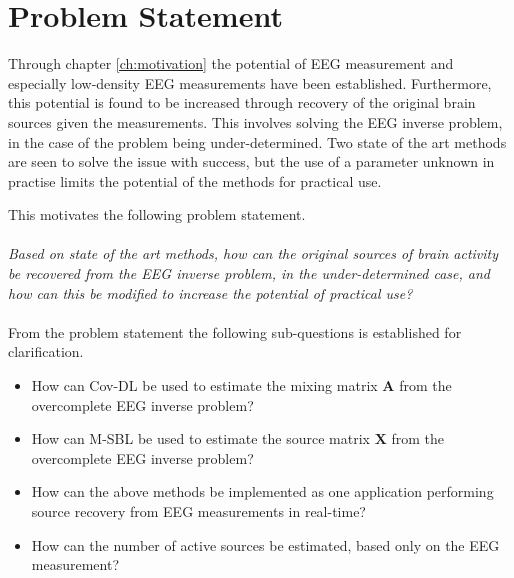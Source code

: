 \chapter{Problem Statement}\label{ch:problemstatement}
Through chapter \ref{ch:motivation} the potential of EEG measurement and especially low-density EEG measurements have been established. Furthermore, this potential is found to be increased through recovery of the original brain sources given the measurements. This involves solving the EEG inverse problem, in the case of the problem being under-determined.
Two state of the art methods are seen to solve the issue with success, but the use of a parameter unknown in practise limits the potential of the methods for practical use.

This motivates the following problem statement.         
\\ \\
\textit{Based on state of the art methods, how can the original sources of brain activity be recovered from the EEG inverse problem, in the under-determined case, and how can this be modified to increase the potential of practical use?}
\\ \\
From the problem statement the following sub-questions is established for clarification.
\begin{itemize}
\item How can Cov-DL be used to estimate the mixing matrix $\mathbf{A}$ from the overcomplete EEG inverse problem?
\item How can M-SBL be used to estimate the source matrix $\mathbf{X}$ from the overcomplete EEG inverse problem?
\item How can the above methods be implemented as one application performing source recovery from EEG measurements in real-time? 
\item How can the number of active sources be estimated, based only on the EEG measurement? 
\end{itemize}

 